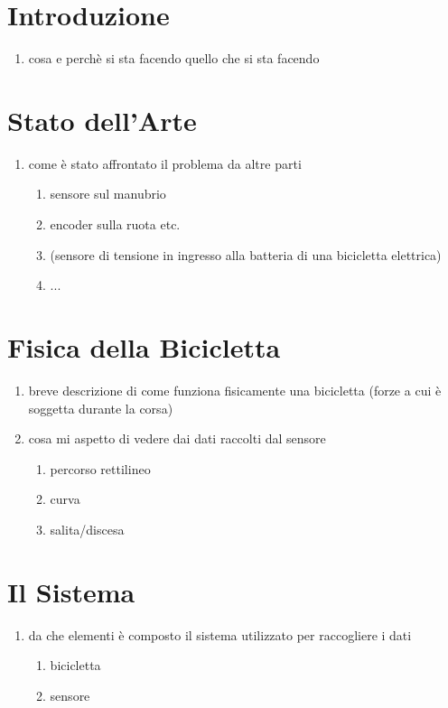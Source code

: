 \documentclass[12pt]{article}
\begin{document}
	
	
	{
		\hypersetup{linkcolor=black}
		\renewcommand*\contentsname{Indice}
		\tableofcontents
	}
	
	\newpage
	\section{Introduzione}
	\begin{enumerate}
		\item cosa e perchè si sta facendo quello che si sta facendo
	\end{enumerate}
	
	\newpage
	\section{Stato dell'Arte}
	\begin{enumerate}
		\item come è stato affrontato il problema da altre parti
		\begin{enumerate}
			\item sensore sul manubrio
			\item encoder sulla ruota etc.
			\item (sensore di tensione in ingresso alla batteria di una bicicletta elettrica)
			\item ...
		\end{enumerate}
	\end{enumerate}
	
	\newpage
	\section{Fisica della Bicicletta}
	\begin{enumerate}
		\item breve descrizione di come funziona fisicamente una bicicletta (forze a cui è soggetta durante la corsa)
		\item cosa mi aspetto di vedere dai dati raccolti dal sensore
		\begin{enumerate}
			\item percorso rettilineo
			\item curva
			\item salita/discesa
		\end{enumerate}
	\end{enumerate}
	
	\newpage
	\section{Il Sistema}
	\begin{enumerate}
		\item da che elementi è composto il sistema utilizzato per raccogliere i dati
		\begin{enumerate}
			\item bicicletta
			\item sensore
		\end{enumerate}
	\end{enumerate}
	
\end{document}
